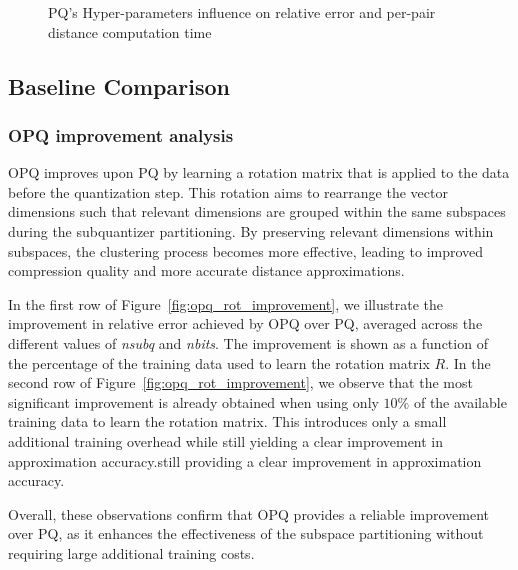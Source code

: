 \documentclass[sigconf]{acmart}
\begin{document}
\begin{figure}[t]
\caption{PQ's Hyper-parameters influence on relative error and per-pair distance computation time}
\label{fig:pq_hp_inf}
\end{figure}

\subsection{Baseline Comparison}
\subsubsection{OPQ improvement analysis}
OPQ improves upon PQ by learning a rotation matrix that is applied to the data before the quantization step. 
This rotation aims to rearrange the vector dimensions such that relevant dimensions are grouped within the same subspaces during the subquantizer partitioning. 
By preserving relevant dimensions within subspaces, the clustering process becomes more effective, leading to improved compression quality and more accurate distance approximations.

In the first row of Figure~\ref{fig:opq_rot_improvement}, we illustrate the improvement in relative error achieved by OPQ over PQ, averaged across the different values of \textit{nsubq} and \textit{nbits}. 
The improvement is shown as a function of the percentage of the training data used to learn the rotation matrix $R$.
In the second row of Figure~\ref{fig:opq_rot_improvement}, we observe that the most significant improvement is already obtained when using only $10\%$ of the available training data to learn the rotation matrix. 
This introduces only a small additional training overhead while still yielding a clear improvement in approximation accuracy.still providing a clear improvement in approximation accuracy.

Overall, these observations confirm that OPQ provides a reliable improvement over PQ, as it enhances the effectiveness of the subspace partitioning without requiring large additional training costs.
\end{document}
